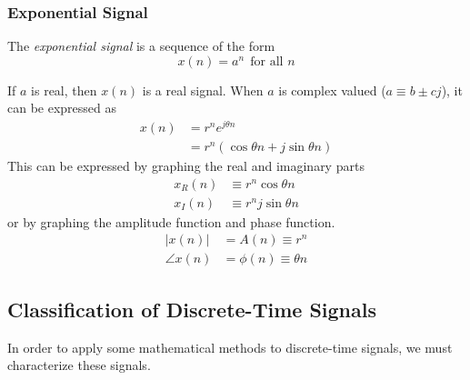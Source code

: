 \subsubsection{Exponential Signal}\label{subsubsec:Exponential Signal}
\begin{definition}\label{def:Exponential Signal}
  The \emph{exponential signal} is a sequence of the form
  \begin{equation}\label{eq:Exponential Signal}
    x(n) = a^{n} \>\> \text{for all } n
  \end{equation}

  If $a$ is real, then $x(n)$ is a real signal.
  When $a$ is complex valued ($a \equiv b \pm c j$), it can be expressed as
   \begin{equation}\label{eq:Complex Exponential Signal}
     \begin{aligned}
       x(n) &= r^{n} e^{j \theta n} \\
       &= r^{n} \left( \cos \theta n + j \sin \theta n \right)
     \end{aligned}
   \end{equation}
  This can be expressed by graphing the real and imaginary parts
  \begin{equation}\label{eq:Real Imaginary Complex Exponential Signal}
    \begin{aligned}
      x_{R}(n) &\equiv r^{n} \cos \theta n \\
      x_{I}(n) &\equiv r^{n} j \sin \theta n
    \end{aligned}
  \end{equation}
  or by graphing the amplitude function and phase function.
  \begin{equation}\label{eq:Amplitude Phase Complex Exponential Signal}
    \begin{aligned}
      \lvert x(n) \rvert &= A(n) \equiv r^{n} \\
      \angle x(n) &= \phi(n) \equiv \theta n
    \end{aligned}
  \end{equation}
\end{definition}

\subsection{Classification of Discrete-Time Signals}\label{subsec:Classification Discrete-Time Signals}
In order to apply some mathematical methods to discrete-time signals, we must characterize these signals.

